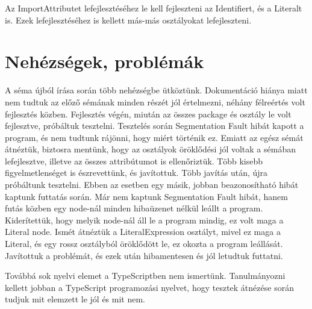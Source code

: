 Az ImportAttributet lefejlesztéséhez le kell fejleszteni az Identifiert, és a Literalt is.
Ezek lefejlesztéséhez is kellett más-más osztályokat lefejleszteni.

\noindent

\section{Nehézségek, problémák}

\noindent

A séma újból írása során több nehézségbe ütköztünk.
Dokumentáció hiánya miatt nem tudtuk az előző sémának minden részét jól értelmezni, néhány félreértés volt fejlesztés közben.
Fejlesztés végén, miután az összes package és osztály le volt fejlesztve, próbáltuk tesztelni.
Tesztelés során Segmentation Fault hibát kapott a program, és nem tudtunk rájönni, hogy miért történik ez.
Emiatt az egész sémát átnéztük, biztosra mentünk, hogy az osztályok öröklődési jól voltak a sémában lefejlesztve, illetve az összes attribútumot is ellenőriztük.
Több kisebb figyelmetlenséget is észrevettünk, és javítottuk.
Több javítás után, újra próbáltunk tesztelni. Ebben az esetben egy másik, jobban beazonosítható hibát kaptunk futtatás során.
Már nem kaptunk Segmentation Fault hibát, hanem futás közben egy node-nál minden hibaüzenet nélkül leállt a program.
Kiderítettük, hogy melyik node-nál áll le a program mindig, ez volt maga a Literal node.
Ismét átnéztük a LiteralExpression osztályt, mivel ez maga a Literal, és egy rossz osztályból öröklődött le, ez okozta a program leállását.
Javítottuk a problémát, és ezek után hibamentesen és jól letudtuk futtatni.

\noindent

Továbbá sok nyelvi elemet a TypeScriptben nem ismertünk.
Tanulmányozni kellett jobban a TypeScript programozási nyelvet, hogy tesztek átnézése során tudjuk mit elemzett le jól és mit nem.
